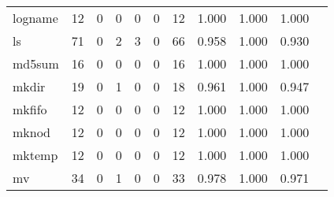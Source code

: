 \begin{longtable}{lp{1.10cm}p{1.10cm}p{1.10cm}p{1.10cm}p{1.10cm}p{1.10cm}p{1.10cm}p{1.10cm}p{1.10cm}p{1.10cm}}
logname   &                     12 &                                  0 &                                 0 &                                0 &                                 0 &                              12 &                          1.000 &                                 1.000 &                               1.000 \\
ls        &                     71 &                                  0 &                                 2 &                                3 &                                 0 &                              66 &                          0.958 &                                 1.000 &                               0.930 \\
md5sum    &                     16 &                                  0 &                                 0 &                                0 &                                 0 &                              16 &                          1.000 &                                 1.000 &                               1.000 \\
mkdir     &                     19 &                                  0 &                                 1 &                                0 &                                 0 &                              18 &                          0.961 &                                 1.000 &                               0.947 \\
mkfifo    &                     12 &                                  0 &                                 0 &                                0 &                                 0 &                              12 &                          1.000 &                                 1.000 &                               1.000 \\
mknod     &                     12 &                                  0 &                                 0 &                                0 &                                 0 &                              12 &                          1.000 &                                 1.000 &                               1.000 \\
mktemp    &                     12 &                                  0 &                                 0 &                                0 &                                 0 &                              12 &                          1.000 &                                 1.000 &                               1.000 \\
mv        &                     34 &                                  0 &                                 1 &                                0 &                                 0 &                              33 &                          0.978 &                                 1.000 &                               0.971 \\

\end{longtable}
